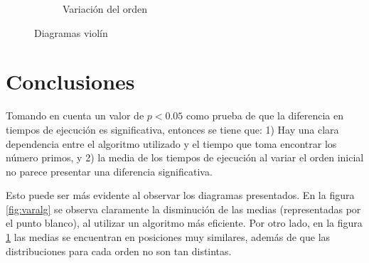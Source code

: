 \documentclass{article}
\begin{document}
\begin{figure}[h]
\begin{subfigure}[b]{0.49\textwidth}
         \caption{Variaci\'on del orden}
         \label{fig:varord}
     \end{subfigure}
     \caption{Diagramas viol\'in}
     \label{diag}
\end{figure}

\newpage

\section{Conclusiones}\label{con}
Tomando en cuenta un valor de $p<0.05$ como prueba de que la diferencia en tiempos de ejecuci\'on es significativa, entonces se tiene que: 1) Hay una clara dependencia entre el algoritmo utilizado y el tiempo que toma encontrar los n\'umero primos, y 2) la media de los tiempos de ejecuci\'on al variar el orden inicial no parece presentar una diferencia significativa.

Esto puede ser m\'as evidente al observar los diagramas presentados. En la figura \ref{fig:varalg} se observa claramente la disminuci\'on de las medias (representadas por el punto blanco), al utilizar un algoritmo m\'as eficiente. Por otro lado, en la figura \ref{fig:varord} las medias se encuentran en posiciones muy similares, adem\'as de que las distribuciones para cada orden no son tan distintas.


\end{document}
